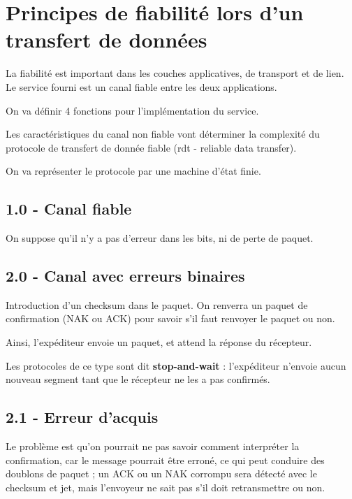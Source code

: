 \section{Principes de fiabilité lors d'un transfert de données}

La fiabilité est important dans les couches applicatives, de transport et de lien. Le service fourni est un canal fiable entre les deux applications.


On va définir 4 fonctions pour l'implémentation du service.	


Les caractéristiques du canal non fiable vont déterminer la complexité du protocole de transfert de donnée fiable (rdt - reliable data transfer).

On va représenter le protocole par une machine d'état finie.

	\subsection{1.0 - Canal fiable}
	
	On suppose qu'il n'y a pas d'erreur dans les bits, ni de perte de paquet.
	
	
	\subsection{2.0 - Canal avec erreurs binaires}
	
	Introduction d'un checksum dans le paquet. On renverra un paquet de confirmation (NAK ou ACK) pour savoir s'il faut renvoyer le paquet ou non. 
	
	
	Ainsi, l'expéditeur envoie un paquet, et attend la réponse du récepteur.
	
	Les protocoles de ce type sont dit \textbf{stop-and-wait} : l'expéditeur n'envoie aucun nouveau segment tant que le récepteur ne les a pas confirmés.
	
	\subsection{2.1 - Erreur d'acquis}
	
	Le problème est qu'on pourrait ne pas savoir comment interpréter la confirmation, car le message pourrait être erroné, ce qui peut conduire  des doublons de paquet ; un ACK ou un NAK corrompu sera détecté avec le checksum et jet, mais l'envoyeur ne sait pas s'il doit retransmettre ou non.
	
